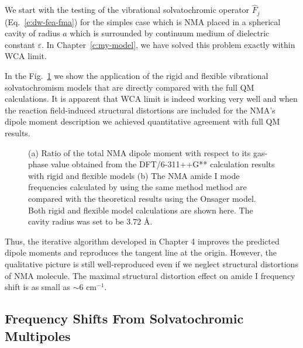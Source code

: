 \documentclass[b5paper,oneside,fleqn,11pt]{book}
\begin{document}
\begin{refsection}
We start with the testing of the vibrational solvatochromic 
operator $\hat{F}_j$ (Eq.~\eqref{e:dw-fea-fma}) 
for the simples case which is NMA
placed in a spherical cavity of radius $a$ which is surrounded
by continuum medium of dielectric constant $\varepsilon$.
In Chapter~\ref{c:my-model}, we have solved this problem exactly within
WCA limit. 

In the Fig.~\ref{f:onsager} we show the application of the rigid
and flexible vibrational solvatochromism models that are directly
compared with the full QM calculations. It is apparent that WCA
limit is indeed working very well and when the reaction field\hyp{}induced 
structural distortions
are included for the NMA's dipole moment description 
we achieved quantitative agreement
with full QM results. 
%
\begin{figure}[t!]
\centering
\setlength\fboxsep{0.4pt}
\setlength\fboxrule{0.5pt}
\caption{
(a) Ratio of the total NMA dipole moment with respect to its gas\hyp{}phase
value obtained from the DFT/6-311++G** calculation results with rigid and flexible
models (b) The NMA amide I mode frequencies calculated by using the same method
method are compared with the theoretical results using the Onsager model. 
Both rigid and flexible model calculations are shown here. The cavity radius was set
to be 3.72 \AA.
\label{f:onsager}}
\end{figure}
%
Thus, the
iterative algorithm developed in Chapter 4 improves the predicted
dipole moments and reproduces the tangent line at the origin.
However, the qualitative
picture is still well\hyp{}reproduced even if we neglect
structural distortions of NMA molecule. The maximal structural
distortion effect on amide I frequency shift is as small
as $\sim$6 cm$^{-1}$.

\subsection{Frequency Shifts From Solvatochromic Multipoles\label{s:amide-I-solvatochr-multipoles}}


\end{refsection}
\end{document}
